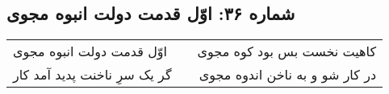 \begin{center}
\section*{شماره ۳۶: اوّل قدمت دولت انبوه مجوی}
\label{sec:036}
\begin{longtable}{l p{0.5cm} r}
اوّل قدمت دولت انبوه مجوی
&&
کاهیت نخست بس بود کوه مجوی
\\
گر یک سرِ ناخنت پدید آمد کار
&&
در کار شو و به ناخن اندوه مجوی
\\
\end{longtable}
\end{center}
